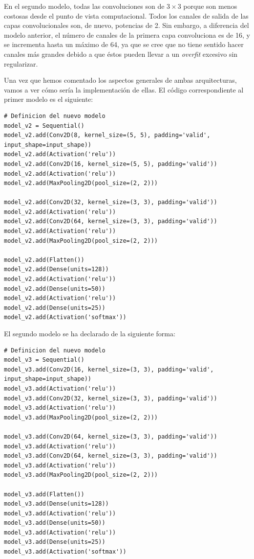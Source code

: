 \documentclass[11pt,a4paper]{article}
\begin{document}
En el segundo modelo, todas las convoluciones son de $3 \times 3$ porque son menos costosas desde el punto de vista
computacional. Todos los canales de salida de las capas convolucionales son, de nuevo, potencias de 2. Sin embargo,
a diferencia del modelo anterior, el número de canales de la primera capa convoluciona es de 16, y se incrementa
hasta un máximo de 64, ya que se cree que no tiene sentido hacer canales más grandes debido a que éstos pueden
llevar a un \textit{overfit} excesivo sin regularizar.

Una vez que hemos comentado los aspectos generales de ambas arquitecturas, vamos a ver cómo sería la implementación
de ellas. El código correspondiente al primer modelo es el siguiente:

\begin{lstlisting}
# Definicion del nuevo modelo
model_v2 = Sequential()
model_v2.add(Conv2D(8, kernel_size=(5, 5), padding='valid', input_shape=input_shape))
model_v2.add(Activation('relu'))
model_v2.add(Conv2D(16, kernel_size=(5, 5), padding='valid'))
model_v2.add(Activation('relu'))
model_v2.add(MaxPooling2D(pool_size=(2, 2)))

model_v2.add(Conv2D(32, kernel_size=(3, 3), padding='valid'))
model_v2.add(Activation('relu'))
model_v2.add(Conv2D(64, kernel_size=(3, 3), padding='valid'))
model_v2.add(Activation('relu'))
model_v2.add(MaxPooling2D(pool_size=(2, 2)))

model_v2.add(Flatten())
model_v2.add(Dense(units=128))
model_v2.add(Activation('relu'))
model_v2.add(Dense(units=50))
model_v2.add(Activation('relu'))
model_v2.add(Dense(units=25))
model_v2.add(Activation('softmax'))
\end{lstlisting}

El segundo modelo se ha declarado de la siguiente forma:

\begin{lstlisting}
# Definicion del nuevo modelo
model_v3 = Sequential()
model_v3.add(Conv2D(16, kernel_size=(3, 3), padding='valid', input_shape=input_shape))
model_v3.add(Activation('relu'))
model_v3.add(Conv2D(32, kernel_size=(3, 3), padding='valid'))
model_v3.add(Activation('relu'))
model_v3.add(MaxPooling2D(pool_size=(2, 2)))

model_v3.add(Conv2D(64, kernel_size=(3, 3), padding='valid'))
model_v3.add(Activation('relu'))
model_v3.add(Conv2D(64, kernel_size=(3, 3), padding='valid'))
model_v3.add(Activation('relu'))
model_v3.add(MaxPooling2D(pool_size=(2, 2)))

model_v3.add(Flatten())
model_v3.add(Dense(units=128))
model_v3.add(Activation('relu'))
model_v3.add(Dense(units=50))
model_v3.add(Activation('relu'))
model_v3.add(Dense(units=25))
model_v3.add(Activation('softmax'))
\end{lstlisting}
\end{document}
